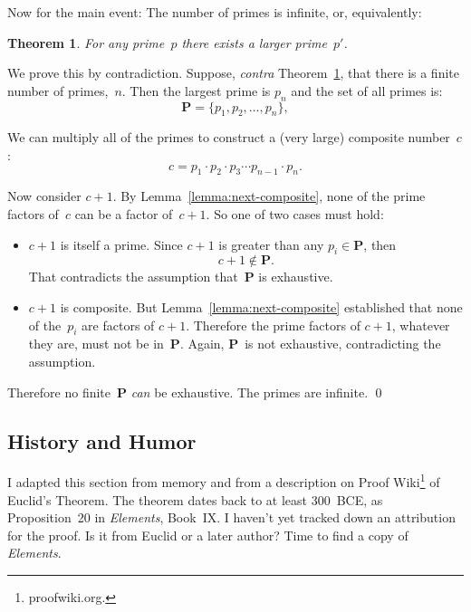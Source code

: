 \documentclass[twocolumn]{article}
\newtheorem{theorem}{Theorem}
\newcommand{\PrimeSet}{\mathbf{P}}
\begin{document}
Now for the main event:
The number of primes is infinite, or, equivalently:
\begin{theorem}
\label{theorem:unbounded-primes}
For any prime~$p$ there exists a larger prime~$p'$.
\end{theorem}

We prove this by contradiction.
Suppose, \textit{contra} Theorem~\ref{theorem:unbounded-primes}, that
there is a finite number of primes,~$n$.
Then the largest prime is $p_n$ and the set of all primes is:
\begin{equation*}
\PrimeSet = \{ p_1, p_2, \ldots, p_n \},
\end{equation*}

We can multiply all of the primes to construct a (very
large) composite number~$c$:
\begin{equation}
c = p_1 \cdot p_2 \cdot p_3 \cdots p_{n-1} \cdot p_n.
\end{equation}

Now consider $c+1$.
By Lemma~\ref{lemma:next-composite}, none of the prime factors of~$c$
can be a factor of~$c+1$.
So one of two cases must hold:
\begin{itemize}
\item $c+1$ is itself a prime.
Since $c+1$ is greater than any $p_i \in \PrimeSet$,
then
\begin{equation}
c+1 \notin \PrimeSet.
\end{equation}
That contradicts the assumption that~$\PrimeSet$ is exhaustive.
\item $c+1$ is composite.
But Lemma~\ref{lemma:next-composite} established that none of
the~$p_i$ are factors of $c+1$.
Therefore the prime factors of $c+1$, whatever they are, must not be
in~$\PrimeSet$.
Again, $\PrimeSet$~is not exhaustive, contradicting the assumption.
\end{itemize}

Therefore no finite~$\PrimeSet$ \emph{can} be exhaustive. The primes are
infinite. \qed

\subsection{History and Humor}

I adapted this section from memory and from a description on Proof
Wiki\footnote{proofwiki.org.} of Euclid's Theorem.
The theorem dates back to at least 300~BCE, as Proposition~20 in
\textit{Elements}, Book~IX.
I haven't yet tracked down an attribution for the proof.  Is it from
Euclid or a later author?  Time to find a copy of \textit{Elements}.
\end{document}

